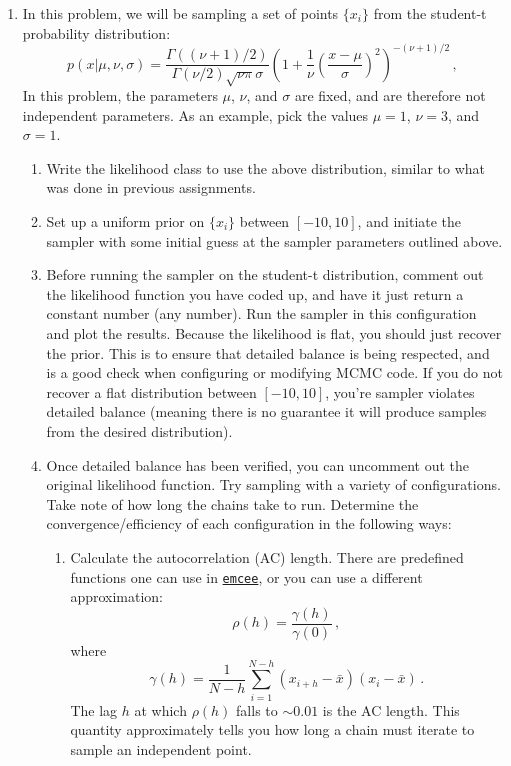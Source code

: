 \documentclass[
    aps,
    10pt,
    prd,
    notitlepage,
    onecolumn,s
    tightenlines,
    nofootinbib]{revtex4-1}
\newcommand{\software}[1]{\texttt{#1}}
\begin{document}
\begin{enumerate}
\item  In this problem, we will be sampling a set of points $\{x_i\}$ from the student-t probability distribution:
\begin{equation}
p(x| \mu,\nu,\sigma) = \frac{ \Gamma( ( \nu + 1) / 2)}{\Gamma(\nu /2) \sqrt{\nu \pi  } \sigma} \left( 1 + \frac{1}{\nu} \left(  \frac{ x  -\mu}{\sigma} \right)^2 \right)^{- (\nu+1)/2}\,,
\end{equation}
In this problem, the parameters $\mu$, $\nu$, and $\sigma$ are fixed, and are therefore not independent parameters.
As an example, pick the values $\mu=1$, $\nu=3$, and $\sigma=1$.
\begin{enumerate}
\item Write the likelihood class to use the above distribution, similar to what was done in previous assignments.

\item Set up a uniform prior on $\{x_i\}$ between $[-10,10]$, and initiate the sampler with some initial guess at the sampler parameters outlined above.

\item Before running the sampler on the student-t distribution, comment out the likelihood function you have coded up, and have it just return a constant number (any number). 
Run the sampler in this configuration and plot the results. 
Because the likelihood is flat, you should just recover the prior.
This is to ensure that detailed balance is being respected, and is a good check when configuring or modifying MCMC code.
If you do not recover a flat distribution between $[-10,10]$, you're sampler violates detailed balance (meaning there is no guarantee it will produce samples from the desired distribution).

\item Once detailed balance has been verified, you can uncomment out the original likelihood function.
Try sampling with a variety of configurations. 
Take note of how long the chains take to run.
Determine the convergence/efficiency of each configuration in the following ways:
\begin{enumerate}
\item Calculate the autocorrelation (AC) length. There are predefined functions one can use in \href{https://emcee.readthedocs.io/en/stable/user/autocorr/}{\software{emcee}}, or you can use a different approximation:
\begin{equation}
\rho(h) = \frac{\gamma(h)}{\gamma(0)}\,,
\end{equation}
where
\begin{equation}
\gamma(h) = \frac{1}{N-h} \sum_{i=1}^{N-h} \left( x_{i+h} -\bar{x} \right)\left( x_{i} -\bar{x} \right)\,.
\end{equation}
The lag $h$ at which $\rho(h)$ falls to $\sim0.01$ is the AC length.
This quantity approximately tells you how long a chain must iterate to sample an independent point.


\end{enumerate}
\end{enumerate}
\end{enumerate}
\end{document}
